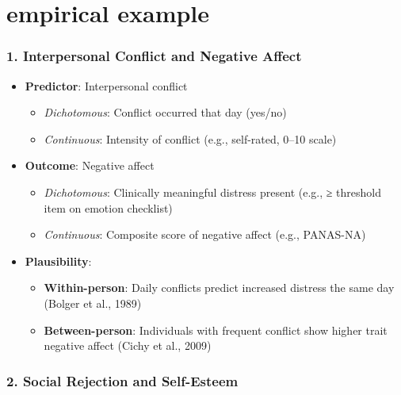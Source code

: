 \section{empirical example}

\subsubsection{\textbf{1. Interpersonal Conflict and Negative Affect}}

\begin{itemize}
    \item \textbf{Predictor}: Interpersonal conflict
    \begin{itemize}
        \item \textit{Dichotomous}: Conflict occurred that day (yes/no)
        \item \textit{Continuous}: Intensity of conflict (e.g., self-rated, 0–10 scale)
    \end{itemize}
    \item \textbf{Outcome}: Negative affect
    \begin{itemize}
        \item \textit{Dichotomous}: Clinically meaningful distress present (e.g., ≥ threshold item on emotion checklist)
        \item \textit{Continuous}: Composite score of negative affect (e.g., PANAS-NA)
    \end{itemize}
    \item \textbf{Plausibility}:
    \begin{itemize}
        \item \textbf{Within-person}: Daily conflicts predict increased distress the same day (Bolger et al., 1989)
        \item \textbf{Between-person}: Individuals with frequent conflict show higher trait negative affect (Cichy et al., 2009)
    \end{itemize}
\end{itemize}

\subsubsection{\textbf{2. Social Rejection and Self-Esteem}}

